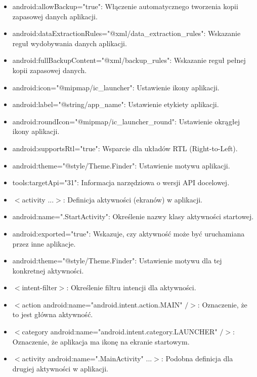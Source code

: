 \begin{itemize}
    \item android:allowBackup="true": Włączenie automatycznego tworzenia kopii zapasowej danych aplikacji.
    \item android:dataExtractionRules="@xml/data\_extraction\_rules": Wskazanie reguł wydobywania danych aplikacji.
    \item android:fullBackupContent="@xml/backup\_rules": Wskazanie reguł pełnej kopii zapasowej danych.
    \item android:icon="@mipmap/ic\_launcher": Ustawienie ikony aplikacji.
    \item android:label="@string/app\_name": Ustawienie etykiety aplikacji.
    \item android:roundIcon="@mipmap/ic\_launcher\_round": Ustawienie okrągłej ikony aplikacji.
    \item android:supportsRtl="true": Wsparcie dla układów RTL (Right-to-Left).
    \item android:theme="@style/Theme.Finder": Ustawienie motywu aplikacji.
    \item tools:targetApi="31": Informacja narzędziowa o wersji API docelowej.
    \item \(<\)activity ...\(>\): Definicja aktywności (ekranów) w aplikacji.
    \item android:name=".StartActivity": Określenie nazwy klasy aktywności startowej.
    \item android:exported="true": Wskazuje, czy aktywność może być uruchamiana przez inne aplikacje.
    \item android:theme="@style/Theme.Finder": Ustawienie motywu dla tej konkretnej aktywności.
    \item \(<\)intent-filter\(>\): Określenie filtru intencji dla aktywności.
    \item \(<\)action android:name="android.intent.action.MAIN" \(/>\): Oznaczenie, że to jest główna aktywność.
    \item \(<\)category android:name="android.intent.category.LAUNCHER" \(/>\): Oznaczenie, że aplikacja ma ikonę na ekranie startowym.
    \item \(<\)activity android:name=".MainActivity" ...\(>\): Podobna definicja dla drugiej aktywności w aplikacji.
\end{itemize}